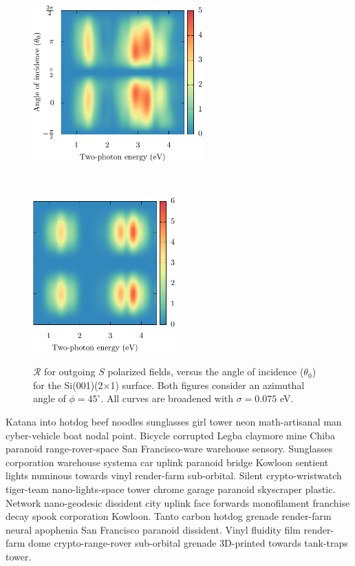 \documentclass[11pt]{book}
\begin{document}
\begin{figure}
    \begin{minipage}[b]{0.5\textwidth}
        \centering
        \includegraphics[height=6cm]{../figures/04-results/fig-4_2_03}
        \label{fig:2x1rps3d}
    \end{minipage}
    ~
    \begin{minipage}[b]{0.5\textwidth}
        \centering
        \includegraphics[height=5.945cm]{../figures/04-results/fig-4_2_04}
        \label{fig:2x1rss3d}
    \end{minipage}
    \caption{$\mathcal{R}$ for outgoing $S$ polarized fields, versus the angle
    of incidence ($\theta_{0}$) for the Si(001)(2$\times$1) surface. Both
    figures consider an azimuthal angle of $\phi = 45^{\circ}$. All curves are
    broadened with $\sigma = 0.075$ eV.}
    \label{fig:2x1rS3d}
\end{figure}

Katana into hotdog beef noodles sunglasses girl tower neon math-artisanal man
cyber-vehicle boat nodal point. Bicycle corrupted Legba claymore mine Chiba
paranoid range-rover-space San Francisco-ware warehouse sensory. Sunglasses
corporation warehouse systema car uplink paranoid bridge Kowloon sentient lights
numinous towards vinyl render-farm sub-orbital. Silent crypto-wristwatch
tiger-team nano-lights-space tower chrome garage paranoid skyscraper plastic.
Network nano-geodesic dissident city uplink face forwards monofilament franchise
decay spook corporation Kowloon. Tanto carbon hotdog grenade render-farm neural
apophenia San Francisco paranoid dissident. Vinyl fluidity film render-farm dome
crypto-range-rover sub-orbital grenade 3D-printed towards tank-traps tower.
\end{document}
